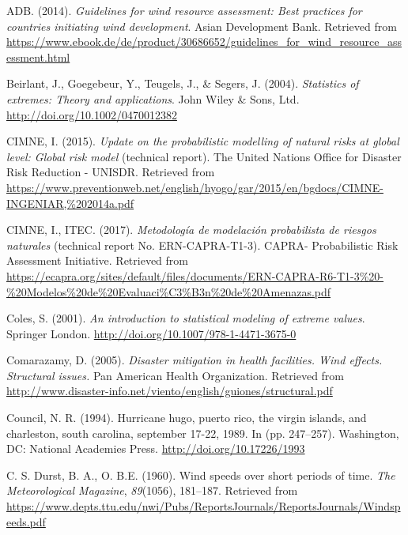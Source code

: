 \documentclass[12pt,oneside]{reedthesis}
\begin{document}
\noindent

\setlength{\parindent}{-0.20in}
\setlength{\leftskip}{0.20in}
\setlength{\parskip}{8pt}

\hypertarget{refs}{}
\leavevmode\hypertarget{ref-windassessment}{}%
ADB. (2014). \emph{Guidelines for wind resource assessment: Best practices for countries initiating wind development}. Asian Development Bank. Retrieved from \url{https://www.ebook.de/de/product/30686652/guidelines_for_wind_resource_assessment.html}

\leavevmode\hypertarget{ref-Beirlant2004}{}%
Beirlant, J., Goegebeur, Y., Teugels, J., \& Segers, J. (2004). \emph{Statistics of extremes: Theory and applications}. John Wiley \& Sons, Ltd. \url{http://doi.org/10.1002/0470012382}

\leavevmode\hypertarget{ref-hurricanemaps}{}%
CIMNE, I. (2015). \emph{Update on the probabilistic modelling of natural risks at global level: Global risk model} (technical report). The United Nations Office for Disaster Risk Reduction - UNISDR. Retrieved from \url{https://www.preventionweb.net/english/hyogo/gar/2015/en/bgdocs/CIMNE-INGENIAR,\%202014a.pdf}

\leavevmode\hypertarget{ref-hurricanemaps2}{}%
CIMNE, I., ITEC. (2017). \emph{Metodología de modelación probabilista de riesgos naturales} (technical report No. ERN-CAPRA-T1-3). CAPRA- Probabilistic Risk Assessment Initiative. Retrieved from \url{https://ecapra.org/sites/default/files/documents/ERN-CAPRA-R6-T1-3\%20-\%20Modelos\%20de\%20Evaluaci\%C3\%B3n\%20de\%20Amenazas.pdf}

\leavevmode\hypertarget{ref-Coles2001}{}%
Coles, S. (2001). \emph{An introduction to statistical modeling of extreme values}. Springer London. \url{http://doi.org/10.1007/978-1-4471-3675-0}

\leavevmode\hypertarget{ref-windeffects}{}%
Comarazamy, D. (2005). \emph{Disaster mitigation in health facilities. Wind effects. Structural issues.} Pan American Health Organization. Retrieved from \url{http://www.disaster-info.net/viento/english/guiones/structural.pdf}

\leavevmode\hypertarget{ref-winddamage}{}%
Council, N. R. (1994). Hurricane hugo, puerto rico, the virgin islands, and charleston, south carolina, september 17-22, 1989. In (pp. 247--257). Washington, DC: National Academies Press. \url{http://doi.org/10.17226/1993}

\leavevmode\hypertarget{ref-Durst1960}{}%
C. S. Durst, B. A., O. B.E. (1960). Wind speeds over short periods of time. \emph{The Meteorological Magazine}, \emph{89}(1056), 181--187. Retrieved from \url{https://www.depts.ttu.edu/nwi/Pubs/ReportsJournals/ReportsJournals/Windspeeds.pdf}
\end{document}

